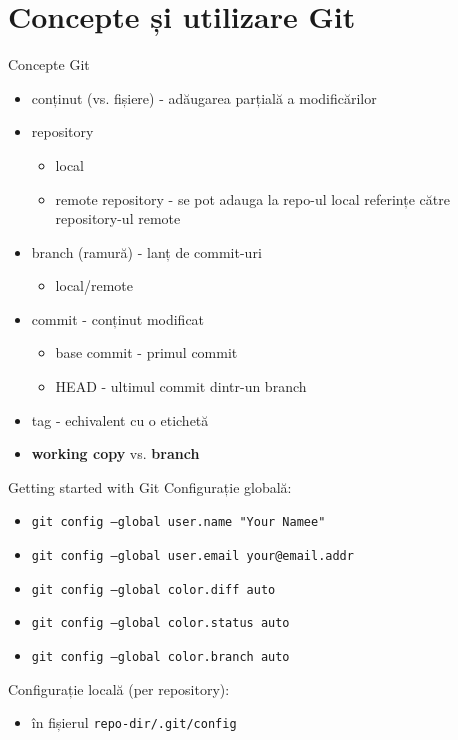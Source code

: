 \documentclass{beamer}
\begin{document}
\section{Concepte și utilizare Git}
\frame{\tableofcontents[currentsection]}
\begin{frame}{Concepte Git}
\begin{itemize} %
\item conținut (vs. fișiere) - adăugarea parțială a modificărilor
\pause\item repository
\begin{itemize}
	\item local 
	\item remote repository - se pot adauga la repo-ul local referințe către repository-ul remote
\end{itemize}
\pause \item branch (ramură) - lanț de commit-uri
\begin{itemize}
	\item local/remote
\end{itemize}
\pause \item commit - conținut modificat
\begin{itemize}
	\item base commit - primul commit
	\item HEAD - ultimul commit dintr-un branch
\end{itemize}
\pause \item tag - echivalent cu o etichetă
\\
\pause \item \textbf{working copy} vs. \textbf{branch}
\end{itemize}
\end{frame}

\begin{frame}{Getting started with Git}
Configurație globală:
\begin{itemize} %
\item \texttt{git config --global user.name "Your Namee"}
\item \texttt{git config --global user.email your@email.addr}
\\
\item \texttt{git config --global color.diff auto}
\item \texttt{git config --global color.status auto}
\item \texttt{git config --global color.branch auto}
\end{itemize}
Configurație locală (per repository):
\begin{itemize} %
\item în fișierul \texttt{repo-dir/.git/config}
\end{itemize}
\end{frame}
\end{document}
